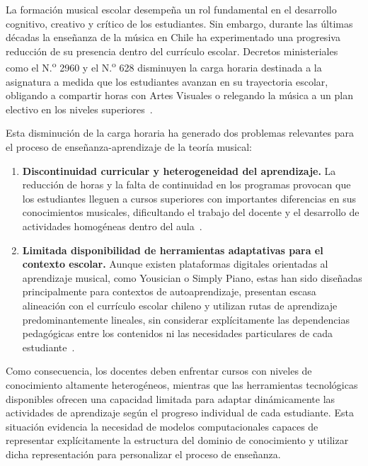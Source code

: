 \documentclass[conference]{IEEEtran}
\begin{document}
La formación musical escolar desempeña un rol fundamental en el desarrollo cognitivo, creativo y crítico de los estudiantes. Sin embargo, durante las últimas décadas la enseñanza de la música en Chile ha experimentado una progresiva reducción de su presencia dentro del currículo escolar. Decretos ministeriales como el N.\textsuperscript{o} 2960 y el N.\textsuperscript{o} 628 disminuyen la carga horaria destinada a la asignatura a medida que los estudiantes avanzan en su trayectoria escolar, obligando a compartir horas con Artes Visuales o relegando la música a un plan electivo en los niveles superiores~\cite{mineduc_decreto2960_2012, mineduc_decreto628_2016}.

Esta disminución de la carga horaria ha generado dos problemas relevantes para el proceso de enseñanza-aprendizaje de la teoría musical:

\begin{enumerate}
\item \textbf{Discontinuidad curricular y heterogeneidad del aprendizaje.} La reducción de horas y la falta de continuidad en los programas provocan que los estudiantes lleguen a cursos superiores con importantes diferencias en sus conocimientos musicales, dificultando el trabajo del docente y el desarrollo de actividades homogéneas dentro del aula~\cite{chandia_educacion_2025}.

\item \textbf{Limitada disponibilidad de herramientas adaptativas para el contexto escolar.} Aunque existen plataformas digitales orientadas al aprendizaje musical, como Yousician o Simply Piano, estas han sido diseñadas principalmente para contextos de autoaprendizaje, presentan escasa alineación con el currículo escolar chileno y utilizan rutas de aprendizaje predominantemente lineales, sin considerar explícitamente las dependencias pedagógicas entre los contenidos ni las necesidades particulares de cada estudiante~\cite{garcia2025, alrowais2025, li2025}.
\end{enumerate}

Como consecuencia, los docentes deben enfrentar cursos con niveles de conocimiento altamente heterogéneos, mientras que las herramientas tecnológicas disponibles ofrecen una capacidad limitada para adaptar dinámicamente las actividades de aprendizaje según el progreso individual de cada estudiante. Esta situación evidencia la necesidad de modelos computacionales capaces de representar explícitamente la estructura del dominio de conocimiento y utilizar dicha representación para personalizar el proceso de enseñanza.
\end{document}
